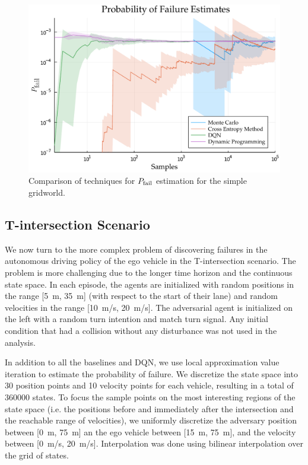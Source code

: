 \begin{figure}
        \centering
        \includegraphics[width=\textwidth]{figures/distribution_over_failures/pfail_gridworld.pdf}
        \caption{Comparison of techniques for $P_{\rm fail}$ estimation for the simple gridworld.}
        \label{fig:gridworld_pfail_vs_samples}
\end{figure}



\subsection{T-intersection Scenario}
\label{sec:ch5_Tint}
We now turn to the more complex problem of discovering failures in the autonomous driving policy of the ego vehicle in the T-intersection scenario. The problem is more challenging due to the longer time horizon  and the continuous state space. In each episode, the agents are initialized with random positions in the range [\SI{5}{m}, \SI{35}{m}] (with respect to the start of their lane) and random velocities in the range [\SI{10}{m/s}, \SI{20}{m/s}]. The adversarial agent is initialized on the left with a random turn intention and match turn signal. Any initial condition that had a collision without any disturbance was not used in the analysis. 

In addition to all the baselines and DQN, we use local approximation value iteration to estimate the probability of failure. We discretize the state space into \num{30} position points and \num{10} velocity points for each vehicle, resulting in a total of \num{360000} states. To focus the sample points on the most interesting regions of the state space (i.e. the positions before and immediately after the intersection and the reachable range of velocities), we uniformly discretize the adversary position between [\SI{0}{m}, \SI{75}{m}] an the ego vehicle between [\SI{15}{m}, \SI{75}{m}], and the velocity between [\SI{0}{m/s}, \SI{20}{m/s}]. Interpolation was done using bilinear interpolation over the grid of states. 


